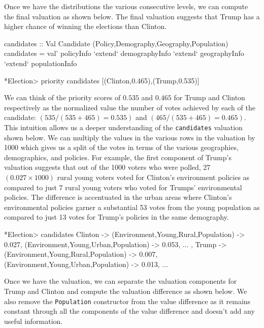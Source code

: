 \documentclass{jfp}
\newcommand{\prog}[1]{\texttt{#1}}
\begin{document}
Once we have the distributions the various consecutive levels, we can compute the final valuation as shown below. The final valuation suggests that Trump has a higher chance of winning the elections than Clinton. 
\begin{haskellcode}
candidates :: Val Candidate (Policy,Demography,Geography,Population)
candidates = val' policyInfo `extend` demographyInfo `extend` geographyInfo 
             `extend` populationInfo

*Election> priority candidates
[(Clinton,0.465),(Trump,0.535)]
\end{haskellcode}

We can think of the priority scores of $0.535$ and $0.465$ for Trump and Clinton respectively as the normalized value the number of votes achieved by each of the candidate: $(535/(535 + 465) = 0.535)$ and $(465/(535 + 465) = 0.465)$. This intuition allows us a deeper understanding of the \prog{candidates} valuation shown below. We can multiply the values in the various rows in the valuation by 1000 which gives us a split of the votes in terms of the various geographies, demographics, and policies. For example, the first component of Trump's valuation suggests that out of the 1000 voters who were polled, 27 $(0.027 \times 1000)$ rural young voters voted for Clinton's environment policies as compared to just 7 rural young voters who voted for Trumps' environmental policies. The difference is accentuated in the urban areas where Clinton's environmental policies garner a substantial 53 votes from the young population as compared to just 13 votes for Trump's policies in the same demography. 
\begin{haskellcode}
*Election> candidates
{Clinton -> {(Environment,Young,Rural,Population) -> 0.027,
             (Environment,Young,Urban,Population) -> 0.053,
                          ...
            },
 Trump -> {(Environment,Young,Rural,Population) -> 0.007,
           (Environment,Young,Urban,Population) -> 0.013,
                       ...
          }}
\end{haskellcode}

Once we have the valuation, we can separate the valuation components for Trump and Clinton and compute the valuation difference as shown below. We also remove the \prog{Population} constructor from the value difference as it remains constant through all the components of the value difference and doesn't add any useful information.
\end{document}
